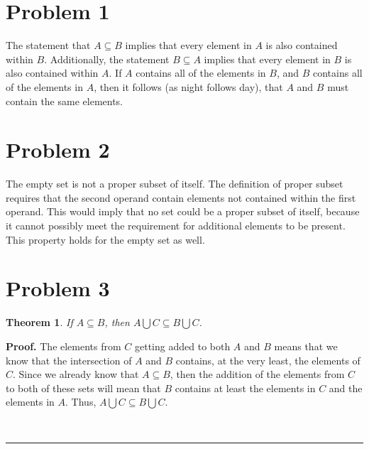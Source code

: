 \documentclass{article}%
\newtheorem{theorem}{Theorem}
\newenvironment{proof}[1][Proof]{\noindent\textbf{#1.} }{\ \rule{0.5em}{0.5em}}
\begin{document}
\section*{Problem 1}


The statement that $A \subseteq B$ implies that every element in $A$ is also contained within $B$. Additionally, the statement
$B \subseteq A$ implies that every element in $B$ is also contained within $A$. If $A$ contains all of the elements in $B$, and
$B$ contains all of the elements in $A$, then it follows (as night follows day), that $A$ and $B$ must contain the same elements.

\section*{Problem 2}


The empty set is not a proper subset of itself. The definition of proper subset requires that the second operand contain elements not
contained within the first operand. This would imply that no set could be a proper subset of itself, because it cannot possibly meet
the requirement for additional elements to be present. This property holds for the empty set as well.

\section*{Problem 3}


\begin{theorem}
    If $A \subseteq B$, then $A \bigcup C \subseteq B \bigcup C$.
\end{theorem}

\begin{proof}
    The elements from $C$ getting added to both $A$ and $B$ means that we know that the intersection of $A$ and $B$ contains, at the very least,
    the elements of $C$. Since we already know that $A \subseteq B$, then the addition of the elements from $C$ to both of these sets will mean
    that $B$ contains at least the elements in $C$ and the elements in $A$. Thus, $A \bigcup C \subseteq B \bigcup C$.

\end{proof}
\end{document}
